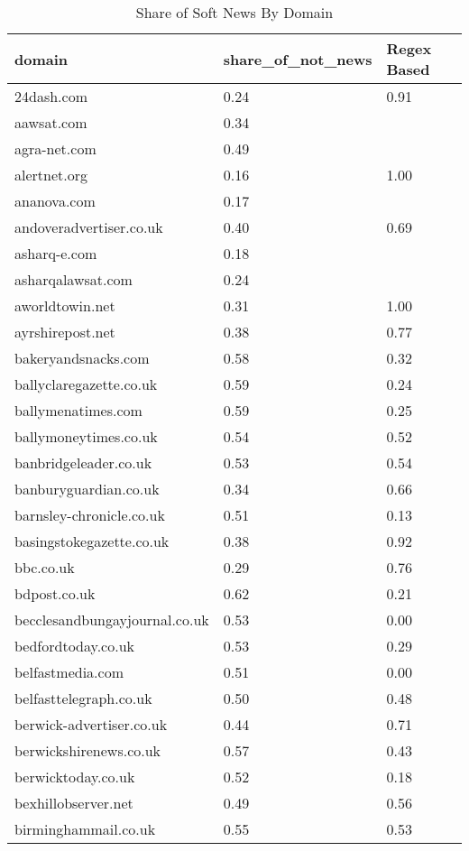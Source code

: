 \begingroup\tiny
\begin{longtable}{p{}p{}p{}}
\caption{Share of Soft News By Domain} \\ 
  \hline
domain & share_of_not_news & Regex Based \\ 
  \hline
24dash.com & 0.24 & 0.91 \\ 
  aawsat.com & 0.34 &  \\ 
  agra-net.com & 0.49 &  \\ 
  alertnet.org & 0.16 & 1.00 \\ 
  ananova.com & 0.17 &  \\ 
  andoveradvertiser.co.uk & 0.40 & 0.69 \\ 
  asharq-e.com & 0.18 &  \\ 
  asharqalawsat.com & 0.24 &  \\ 
  aworldtowin.net & 0.31 & 1.00 \\ 
  ayrshirepost.net & 0.38 & 0.77 \\ 
  bakeryandsnacks.com & 0.58 & 0.32 \\ 
  ballyclaregazette.co.uk & 0.59 & 0.24 \\ 
  ballymenatimes.com & 0.59 & 0.25 \\ 
  ballymoneytimes.co.uk & 0.54 & 0.52 \\ 
  banbridgeleader.co.uk & 0.53 & 0.54 \\ 
  banburyguardian.co.uk & 0.34 & 0.66 \\ 
  barnsley-chronicle.co.uk & 0.51 & 0.13 \\ 
  basingstokegazette.co.uk & 0.38 & 0.92 \\ 
  bbc.co.uk & 0.29 & 0.76 \\ 
  bdpost.co.uk & 0.62 & 0.21 \\ 
  becclesandbungayjournal.co.uk & 0.53 & 0.00 \\ 
  bedfordtoday.co.uk & 0.53 & 0.29 \\ 
  belfastmedia.com & 0.51 & 0.00 \\ 
  belfasttelegraph.co.uk & 0.50 & 0.48 \\ 
  berwick-advertiser.co.uk & 0.44 & 0.71 \\ 
  berwickshirenews.co.uk & 0.57 & 0.43 \\ 
  berwicktoday.co.uk & 0.52 & 0.18 \\ 
  bexhillobserver.net & 0.49 & 0.56 \\ 
  birminghammail.co.uk & 0.55 & 0.53 \\ 

\end{longtable}

